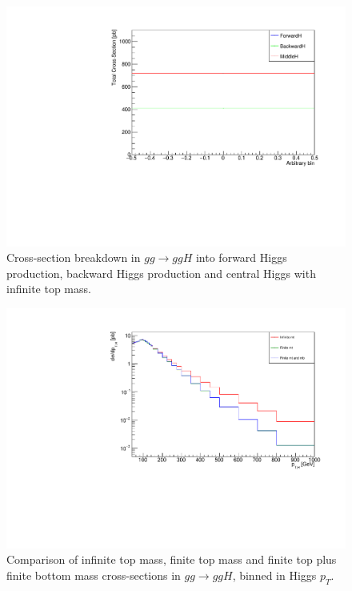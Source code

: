 \begin{figure}[t]
\centering
\includegraphics[scale=0.75]{Images/xsec_breakdown_ggh.pdf}
\caption{Cross-section breakdown in $gg \to ggH$ into forward Higgs production, backward Higgs production and central Higgs with infinite top mass.}
\label{fig:gg_crosssection}
\end{figure}

\begin{figure}[H]
\centering
\includegraphics[scale=0.7]{Images/ptH_gg.pdf}
\caption{Comparison of infinite top mass, finite top mass and finite top plus finite bottom mass cross-sections in $gg \to ggH$, binned in Higgs $p_T$. }
\label{fig:pth_gg}
\end{figure}

